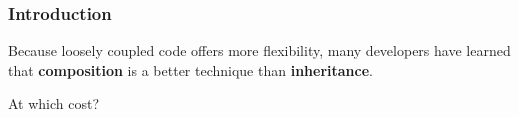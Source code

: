 \begin{frame}
    \frametitle{Introduction}
    Because loosely coupled code offers more flexibility, many developers have learned that
    \textbf{composition} is a better technique than \textbf{inheritance}.
\end{frame}

\begin{frame}[c]
    \begin{center}
        \Huge At which cost?
    \end{center}
\end{frame}
